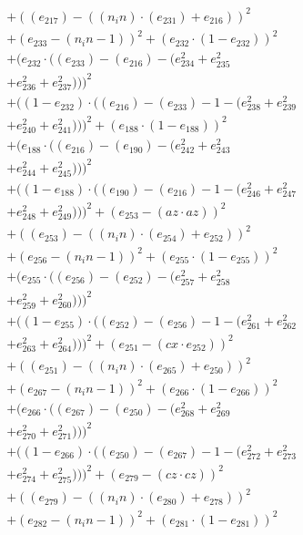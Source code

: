 \documentclass[10pt, a4paper]{article}
\begin{document}
\begin{small}
\begin{align*}
& + ((e_{217}) - ((n_in)  \cdot  (e_{231}) + e_{216}))^{2} \\
& + (e_{233} - (n_in - 1))^{2} + (e_{232}  \cdot  (1 - e_{232}))^{2} \\
& + (e_{232}  \cdot  ((e_{233}) - (e_{216}) - (e_{234}^{2} + e_{235}^{2} \\
& + e_{236}^{2} + e_{237}^{2})))^{2} \\
& + ((1 - e_{232})  \cdot  ((e_{216}) - (e_{233}) - 1 - (e_{238}^{2} + e_{239}^{2} \\
& + e_{240}^{2} + e_{241}^{2})))^{2} + (e_{188}  \cdot  (1 - e_{188}))^{2} \\
& + (e_{188}  \cdot  ((e_{216}) - (e_{190}) - (e_{242}^{2} + e_{243}^{2} \\
& + e_{244}^{2} + e_{245}^{2})))^{2} \\
& + ((1 - e_{188})  \cdot  ((e_{190}) - (e_{216}) - 1 - (e_{246}^{2} + e_{247}^{2} \\
& + e_{248}^{2} + e_{249}^{2})))^{2} + (e_{253} - (az  \cdot  az))^{2} \\
& + ((e_{253}) - ((n_in)  \cdot  (e_{254}) + e_{252}))^{2} \\
& + (e_{256} - (n_in - 1))^{2} + (e_{255}  \cdot  (1 - e_{255}))^{2} \\
& + (e_{255}  \cdot  ((e_{256}) - (e_{252}) - (e_{257}^{2} + e_{258}^{2} \\
& + e_{259}^{2} + e_{260}^{2})))^{2} \\
& + ((1 - e_{255})  \cdot  ((e_{252}) - (e_{256}) - 1 - (e_{261}^{2} + e_{262}^{2} \\
& + e_{263}^{2} + e_{264}^{2})))^{2} + (e_{251} - (cx  \cdot  e_{252}))^{2} \\
& + ((e_{251}) - ((n_in)  \cdot  (e_{265}) + e_{250}))^{2} \\
& + (e_{267} - (n_in - 1))^{2} + (e_{266}  \cdot  (1 - e_{266}))^{2} \\
& + (e_{266}  \cdot  ((e_{267}) - (e_{250}) - (e_{268}^{2} + e_{269}^{2} \\
& + e_{270}^{2} + e_{271}^{2})))^{2} \\
& + ((1 - e_{266})  \cdot  ((e_{250}) - (e_{267}) - 1 - (e_{272}^{2} + e_{273}^{2} \\
& + e_{274}^{2} + e_{275}^{2})))^{2} + (e_{279} - (cz  \cdot  cz))^{2} \\
& + ((e_{279}) - ((n_in)  \cdot  (e_{280}) + e_{278}))^{2} \\
& + (e_{282} - (n_in - 1))^{2} + (e_{281}  \cdot  (1 - e_{281}))^{2} \\

\end{align*}
\end{small}
\end{document}
